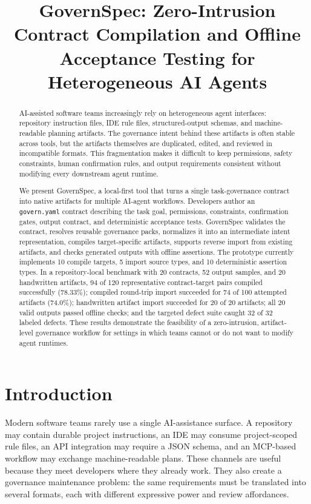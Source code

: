 \documentclass[10pt,conference]{IEEEtran}
\title{GovernSpec: Zero-Intrusion Contract Compilation and Offline Acceptance Testing for Heterogeneous AI Agents}
\author{\IEEEauthorblockN{Ting Liu}
\IEEEauthorblockA{SymbolicLight Research\\
Foshan, Guangdong, China\\
research@symboliclight.com}}
\begin{document}
\maketitle

\begin{abstract}
AI-assisted software teams increasingly rely on heterogeneous agent interfaces:
repository instruction files, IDE rule files, structured-output schemas, and
machine-readable planning artifacts. The governance intent behind these artifacts is
often stable across tools, but the artifacts themselves are duplicated, edited, and
reviewed in incompatible formats. This fragmentation makes it difficult to keep
permissions, safety constraints, human confirmation rules, and output requirements
consistent without modifying every downstream agent runtime.

We present GovernSpec, a local-first tool that turns a single task-governance
contract into native artifacts for multiple AI-agent workflows. Developers author an
\texttt{govern.yaml} contract describing the task goal, permissions, constraints,
confirmation gates, output contract, and deterministic acceptance tests. GovernSpec
validates the contract, resolves reusable governance packs, normalizes it into an
intermediate intent representation, compiles target-specific artifacts, supports
reverse import from existing artifacts, and checks generated outputs with offline
assertions. The prototype currently implements 10 compile targets, 5 import source
types, and 10 deterministic assertion types. In a repository-local benchmark with
20 contracts, 52 output samples, and 20 handwritten artifacts, 94 of 120
representative contract-target pairs compiled successfully (78.33\%); compiled
round-trip import succeeded for 74 of 100 attempted artifacts (74.0\%);
handwritten artifact import succeeded for 20 of 20 artifacts; all 20 valid outputs
passed offline checks; and the targeted defect suite caught 32 of 32 labeled
defects. These results demonstrate the
feasibility of a zero-intrusion, artifact-level governance workflow for settings in
which teams cannot or do not want to modify agent runtimes.
\end{abstract}

\section{Introduction}

Modern software teams rarely use a single AI-assistance surface. A repository may
contain durable project instructions, an IDE may consume project-scoped rule files,
an API integration may require a JSON schema, and an MCP-based workflow may exchange
machine-readable plans. These channels are useful because they meet developers where
they already work. They also create a governance maintenance problem: the same
requirements must be translated into several formats, each with different expressive
power and review affordances.
\end{document}
